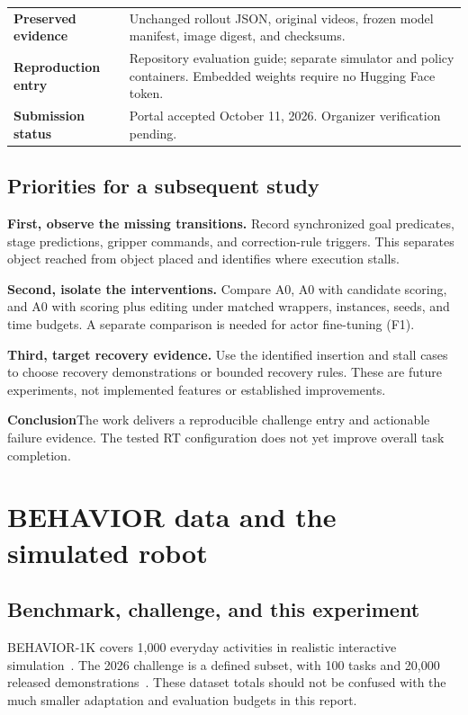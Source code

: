 \documentclass[11pt]{article}
\newcommand{\note}[2]{\begin{tcolorbox}[colback=pale,colframe=pale,boxrule=0pt,arc=1.5mm,left=3mm,right=3mm,top=2mm,bottom=2mm]\textbf{\color{ink}#1}\quad #2\end{tcolorbox}}
\begin{document}
\par\vspace{2pt}
\begin{tabularx}{\linewidth}{@{}p{.26\linewidth}X@{}}\toprule
\textbf{Preserved evidence} & Unchanged rollout JSON, original videos, frozen model manifest, image digest, and checksums.\\
\textbf{Reproduction entry} & Repository evaluation guide; separate simulator and policy containers. Embedded weights require no Hugging Face token.\\
\textbf{Submission status} & Portal accepted October 11, 2026. Organizer verification pending.\\
\bottomrule\end{tabularx}\par\vspace{2pt}

\subsection{Priorities for a subsequent study}
\textbf{First, observe the missing transitions.} Record synchronized goal predicates, stage predictions, gripper commands, and correction-rule triggers. This separates object reached from object placed and identifies where execution stalls.

\textbf{Second, isolate the interventions.} Compare A0, A0 with candidate scoring, and A0 with scoring plus editing under matched wrappers, instances, seeds, and time budgets. A separate comparison is needed for actor fine-tuning (F1).

\textbf{Third, target recovery evidence.} Use the identified insertion and stall cases to choose recovery demonstrations or bounded recovery rules. These are future experiments, not implemented features or established improvements.
\note{Conclusion}{The work delivers a reproducible challenge entry and actionable failure evidence. The tested RT configuration does not yet improve overall task completion.}

\newpage
\appendix
\section{BEHAVIOR data and the simulated robot}
\subsection{Benchmark, challenge, and this experiment}
BEHAVIOR-1K covers 1,000 everyday activities in realistic interactive simulation~\cite{behavior}. The 2026 challenge is a defined subset, with 100 tasks and 20,000 released demonstrations~\cite{dataset2026}. These dataset totals should not be confused with the much smaller adaptation and evaluation budgets in this report.
\end{document}
